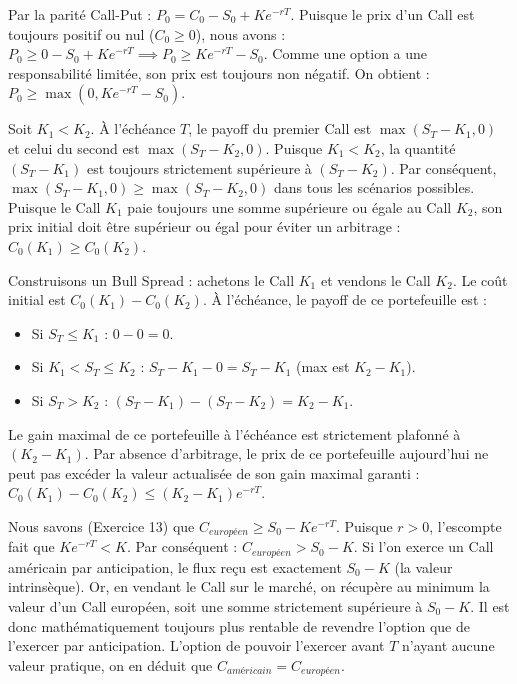 \begin{correctionbox}
Par la parité Call-Put : $P_0 = C_0 - S_0 + K e^{-rT}$.
Puisque le prix d'un Call est toujours positif ou nul ($C_0 \ge 0$), nous avons :
$P_0 \ge 0 - S_0 + K e^{-rT} \implies P_0 \ge K e^{-rT} - S_0$.
Comme une option a une responsabilité limitée, son prix est toujours non négatif. 
On obtient : $P_0 \ge \max(0, K e^{-rT} - S_0)$.
\end{correctionbox}

\begin{correctionbox}
Soit $K_1 < K_2$. À l'échéance $T$, le payoff du premier Call est $\max(S_T - K_1, 0)$ et celui du second est $\max(S_T - K_2, 0)$.
Puisque $K_1 < K_2$, la quantité $(S_T - K_1)$ est toujours strictement supérieure à $(S_T - K_2)$.
Par conséquent, $\max(S_T - K_1, 0) \ge \max(S_T - K_2, 0)$ dans tous les scénarios possibles.
Puisque le Call $K_1$ paie toujours une somme supérieure ou égale au Call $K_2$, son prix initial doit être supérieur ou égal pour éviter un arbitrage :
$C_0(K_1) \ge C_0(K_2)$.
\end{correctionbox}

\begin{correctionbox}
Construisons un Bull Spread : achetons le Call $K_1$ et vendons le Call $K_2$.
Le coût initial est $C_0(K_1) - C_0(K_2)$.
À l'échéance, le payoff de ce portefeuille est :
\begin{itemize}[label=$\cdot$]
    \item Si $S_T \le K_1$ : $0 - 0 = 0$.
    \item Si $K_1 < S_T \le K_2$ : $S_T - K_1 - 0 = S_T - K_1$ (max est $K_2 - K_1$).
    \item Si $S_T > K_2$ : $(S_T - K_1) - (S_T - K_2) = K_2 - K_1$.
\end{itemize}
Le gain maximal de ce portefeuille à l'échéance est strictement plafonné à $(K_2 - K_1)$.
Par absence d'arbitrage, le prix de ce portefeuille aujourd'hui ne peut pas excéder la valeur actualisée de son gain maximal garanti :
$C_0(K_1) - C_0(K_2) \le (K_2 - K_1)e^{-rT}$.
\end{correctionbox}

\begin{correctionbox}
Nous savons (Exercice 13) que $C_{européen} \ge S_0 - K e^{-rT}$.
Puisque $r > 0$, l'escompte fait que $K e^{-rT} < K$. Par conséquent :
$C_{européen} > S_0 - K$.
Si l'on exerce un Call américain par anticipation, le flux reçu est exactement $S_0 - K$ (la valeur intrinsèque). 
Or, en vendant le Call sur le marché, on récupère au minimum la valeur d'un Call européen, soit une somme strictement supérieure à $S_0 - K$. Il est donc mathématiquement toujours plus rentable de revendre l'option que de l'exercer par anticipation. L'option de pouvoir l'exercer avant $T$ n'ayant aucune valeur pratique, on en déduit que $C_{américain} = C_{européen}$.
\end{correctionbox}

